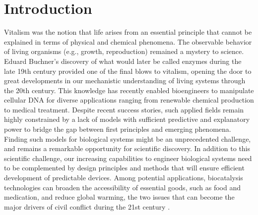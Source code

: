 \chapter*{Introduction} \label{ch:introduction}





Vitalism was the notion that life arises from an essential principle that cannot be explained in terms of physical and chemical phenomena.
The observable behavior of living organisms (e.g., growth, reproduction) remained a mystery to science.
Eduard Buchner's discovery of what would later be called enzymes during the late 19th century provided one of the final blows to vitalism, opening the door to
great developments in our mechanistic understanding of living systems through the 20th century.
This knowledge has recently enabled bioengineers to manipulate cellular DNA for diverse applications ranging from renewable chemical production to medical treatment. Despite recent success stories, such applied fields remain highly constrained by a lack of models with sufficient predictive and explanatory power to bridge the gap between first principles and emerging phenomena.
Finding such models for biological systems might be an unprecedented challenge, and remains a remarkable opportunity for scientific discovery.
In addition to this scientific challenge, our increasing capabilities to engineer biological systems need to be complemented by design principles and methods that will ensure efficient development of predictable devices. %
Among potential applications, biocatalysis technologies can broaden the accessibility of essential goods, such as food and medication, and reduce global warming, the two issues that can become the major drivers of civil conflict during the 21st century \citep{barnett2007, hsiang2011, dod2015}. %


